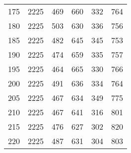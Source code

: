 \begin{longtable}{|l|l|l|l|l|l|}
175 & 2225 & 469 & 660 & 332 & 764 \\
180 & 2225 & 503 & 630 & 336 & 756 \\
185 & 2225 & 482 & 645 & 345 & 753 \\
190 & 2225 & 474 & 659 & 335 & 757 \\
195 & 2225 & 464 & 665 & 330 & 766 \\
200 & 2225 & 491 & 636 & 334 & 764 \\
205 & 2225 & 467 & 634 & 349 & 775 \\
210 & 2225 & 467 & 641 & 316 & 801 \\
215 & 2225 & 476 & 627 & 302 & 820 \\
220 & 2225 & 487 & 631 & 304 & 803 \\


	
	\bottomrule
\end{longtable}




